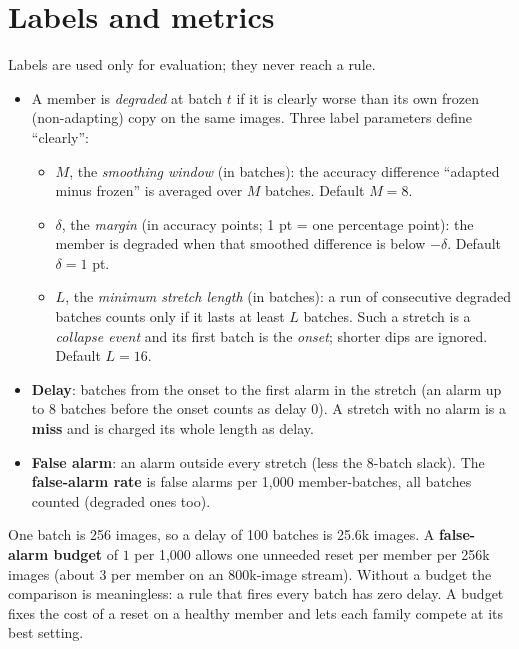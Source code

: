 \documentclass[10pt]{article}
\begin{document}
\section{Labels and metrics}\label{sec:labels}
Labels are used only for evaluation; they never reach a rule.
\begin{itemize}
  \item A member is \emph{degraded} at batch $t$ if it is clearly worse than its own frozen (non-adapting) copy on the same images. Three label parameters define ``clearly'':
  \begin{itemize}
    \item $M$, the \emph{smoothing window} (in batches): the accuracy difference ``adapted minus frozen'' is averaged over $M$ batches. Default $M = 8$.
    \item $\delta$, the \emph{margin} (in accuracy points; 1 pt = one percentage point): the member is degraded when that smoothed difference is below $-\delta$. Default $\delta = 1$ pt.
    \item $L$, the \emph{minimum stretch length} (in batches): a run of consecutive degraded batches counts only if it lasts at least $L$ batches. Such a stretch is a \emph{collapse event} and its first batch is the \emph{onset}; shorter dips are ignored. Default $L = 16$.
  \end{itemize}
  \item \textbf{Delay}: batches from the onset to the first alarm in the stretch (an alarm up to 8 batches before the onset counts as delay $0$). A stretch with no alarm is a \textbf{miss} and is charged its whole length as delay.
  \item \textbf{False alarm}: an alarm outside every stretch (less the 8-batch slack). The \textbf{false-alarm rate} is false alarms per 1,000 member-batches, all batches counted (degraded ones too).
\end{itemize}
One batch is 256 images, so a delay of 100 batches is 25.6k images. A \textbf{false-alarm budget} of $1$ per 1,000 allows one unneeded reset per member per 256k images (about 3 per member on an 800k-image stream).
Without a budget the comparison is meaningless: a rule that fires every batch has zero delay. A budget fixes the cost of a reset on a healthy member and lets each family compete at its best setting.
\end{document}
